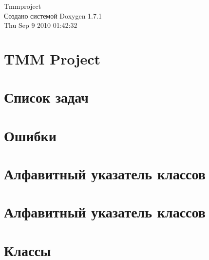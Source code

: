 \documentclass[a4paper]{book}
\begin{document}
\hypersetup{pageanchor=false}
\begin{titlepage}
\vspace*{7cm}
\begin{center}
{\Large Tmmproject }\\
\vspace*{1cm}
{\large Создано системой Doxygen 1.7.1}\\
\vspace*{0.5cm}
{\small Thu Sep 9 2010 01:42:32}\\
\end{center}
\end{titlepage}
\clearemptydoublepage
{}
\tableofcontents
\clearemptydoublepage
{}
\hypersetup{pageanchor=true}
\chapter{TMM Project}
\label{index}\hypertarget{index}{}
\chapter{Список задач}
\label{todo}
\hypertarget{todo}{}

\chapter{Ошибки}
\label{bug}
\hypertarget{bug}{}

\chapter{Алфавитный указатель классов}

\chapter{Алфавитный указатель классов}

\chapter{Классы}





























\printindex
\end{document}
